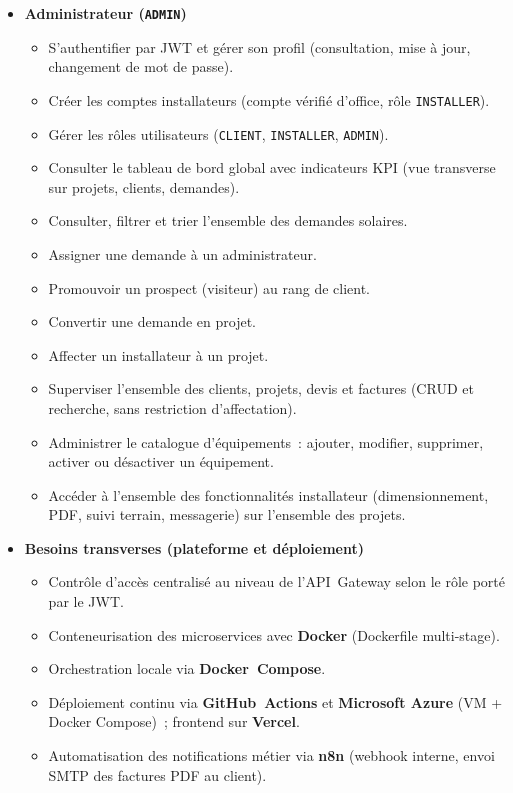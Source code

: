\begin{itemize}[leftmargin=1.6em, label={$\bullet$}]
  \item \textbf{Administrateur (\texttt{ADMIN})}
  \begin{itemize}[leftmargin=2em, label={--}]
    \item S'authentifier par JWT et gérer son profil (consultation, mise à jour,
      changement de mot de passe).
    \item Créer les comptes installateurs (compte vérifié d'office, rôle
      \texttt{INSTALLER}).
    \item Gérer les rôles utilisateurs (\texttt{CLIENT}, \texttt{INSTALLER},
      \texttt{ADMIN}).
    \item Consulter le tableau de bord global avec indicateurs KPI (vue
      transverse sur projets, clients, demandes).
    \item Consulter, filtrer et trier l'ensemble des demandes solaires.
    \item Assigner une demande à un administrateur.
    \item Promouvoir un prospect (visiteur) au rang de client.
    \item Convertir une demande en projet.
    \item Affecter un installateur à un projet.
    \item Superviser l'ensemble des clients, projets, devis et factures
      (CRUD et recherche, sans restriction d'affectation).
    \item Administrer le catalogue d'équipements~: ajouter, modifier,
      supprimer, activer ou désactiver un équipement.
    \item Accéder à l'ensemble des fonctionnalités installateur (dimensionnement,
      PDF, suivi terrain, messagerie) sur l'ensemble des projets.
  \end{itemize}

  \item \textbf{Besoins transverses (plateforme et déploiement)}
  \begin{itemize}[leftmargin=2em, label={--}]
    \item Contrôle d'accès centralisé au niveau de l'API~Gateway selon le
      rôle porté par le JWT.
    \item Conteneurisation des microservices avec \textbf{Docker}
      (Dockerfile multi-stage).
    \item Orchestration locale via \textbf{Docker~Compose}.
    \item Déploiement continu via \textbf{GitHub~Actions} et
      \textbf{Microsoft Azure} (VM + Docker Compose)~; frontend sur
      \textbf{Vercel}.
    \item Automatisation des notifications métier via \textbf{n8n}
      (webhook interne, envoi SMTP des factures PDF au client).
  \end{itemize}

\end{itemize}

